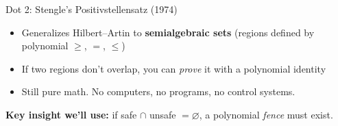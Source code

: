 \documentclass[aspectratio=169]{beamer}
\begin{document}
\begin{frame}{Dot 2: Stengle's Positivstellensatz (1974)}
\begin{center}
\end{center}

\vspace{1em}
\begin{itemize}
  \item Generalizes Hilbert--Artin to \textbf{semialgebraic sets} (regions defined by polynomial $\ge$, $=$, $\le$)
  \item If two regions don't overlap, you can \emph{prove} it with a polynomial identity
  \item Still pure math. No computers, no programs, no control systems.
\end{itemize}

\vspace{0.5em}
\centering
\textcolor{hilbert!70}{\faLightbulb}\; \textbf{Key insight we'll use:} if safe $\cap$ unsafe $= \varnothing$, a polynomial \emph{fence} must exist.
\end{frame}

\end{document}
